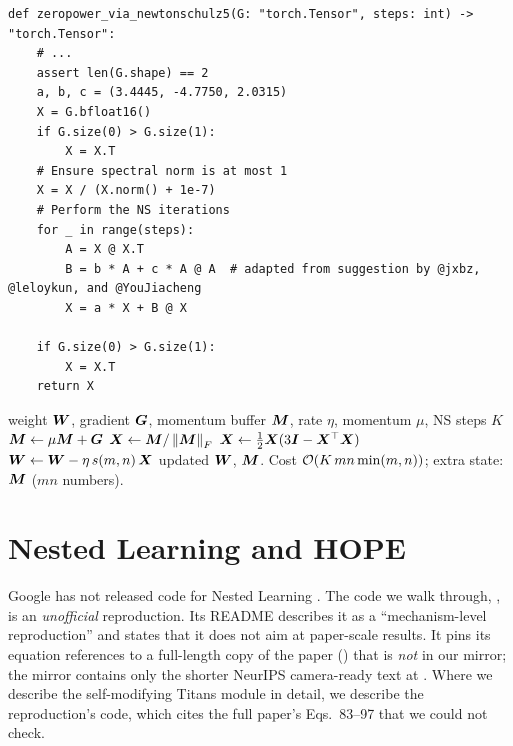 \begin{lstlisting}[caption={Excerpt from \texttt{repos/\allowbreak awslabs\_\_hybrid-model-factory/\allowbreak training/\allowbreak src/\allowbreak hmf/\allowbreak third\_party/\allowbreak muon/\allowbreak muon.py} (the widely used quintic Newton--Schulz of Muon; docstring elided)},label={lst:c11-muon-ns5}]
def zeropower_via_newtonschulz5(G: "torch.Tensor", steps: int) -> "torch.Tensor":
    # ...
    assert len(G.shape) == 2
    a, b, c = (3.4445, -4.7750, 2.0315)
    X = G.bfloat16()
    if G.size(0) > G.size(1):
        X = X.T
    # Ensure spectral norm is at most 1
    X = X / (X.norm() + 1e-7)
    # Perform the NS iterations
    for _ in range(steps):
        A = X @ X.T
        B = b * A + c * A @ A  # adapted from suggestion by @jxbz, @leloykun, and @YouJiacheng
        X = a * X + B @ X

    if G.size(0) > G.size(1):
        X = X.T
    return X
\end{lstlisting}

\begin{algorithm}[t]
\caption{One Muon step for a weight matrix $\mW \in \R^{m\times n}$.}\label{alg:c11-muon}
\begin{algorithmic}[1]
\Require weight $\bm{W}$, gradient $\bm{G}$, momentum buffer $\bm{M}$, rate $\eta$, momentum $\mu$, NS steps $K$
\State $\bm{M} \gets \mu\bm{M} + \bm{G}$ 
\State $\bm{X} \gets \bm{M}/\left\lVert \bm{M}\right\rVert_F$ \Comment{singular values now in $(0,1]$}
  \State $\bm{X} \gets \tfrac12\bm{X}(3\bm{I} - \bm{X}^{\top}\bm{X})$ 
\EndFor
\State $\bm{W} \gets \bm{W} - \eta\, s(m,n)\,\bm{X}$ 
\Ensure updated $\bm{W}$, $\bm{M}$. Cost $\mathcal{O}(K\,mn\min(m,n))$; extra state: $\bm{M}$ ($mn$ numbers).
\end{algorithmic}
\end{algorithm}

\section{Nested Learning and HOPE}\label{sec:c11-nested}

\begin{pitfall}[title={Unofficial code}]
Google has not released code for Nested Learning \citep{behrouz2025nested}. The code we walk
through, , is an \emph{unofficial} reproduction. Its README
describes it as a ``mechanism-level reproduction'' and states that it does not aim at
paper-scale results. It pins its equation references to a full-length copy of the paper
() that is \emph{not} in our mirror; the mirror
contains only the shorter NeurIPS camera-ready text at
.
Where we describe the self-modifying Titans module in detail, we describe the reproduction's
code, which cites the full paper's Eqs.~83--97 that we could not check.
\end{pitfall}

